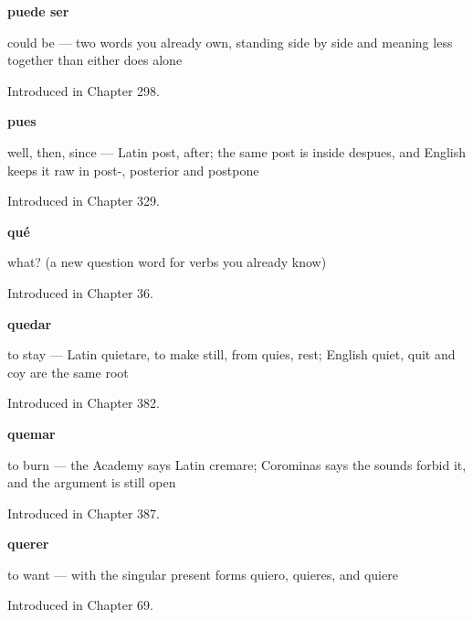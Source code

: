 \noindent\begin{minipage}[t]{\linewidth}
\raggedright
\textbf{puede ser}\par
\small could be — two words you already own, standing side by side and meaning less together than either does alone\par
\footnotesize Introduced in Chapter 298.
\end{minipage}\par\medskip

\noindent\begin{minipage}[t]{\linewidth}
\raggedright
\textbf{pues}\par
\small well, then, since — Latin post, after; the same post is inside despues, and English keeps it raw in post-, posterior and postpone\par
\footnotesize Introduced in Chapter 329.
\end{minipage}\par\medskip

\noindent\begin{minipage}[t]{\linewidth}
\raggedright
\textbf{qué}\par
\small what? (a new question word for verbs you already know)\par
\footnotesize Introduced in Chapter 36.
\end{minipage}\par\medskip

\noindent\begin{minipage}[t]{\linewidth}
\raggedright
\textbf{quedar}\par
\small to stay — Latin quietare, to make still, from quies, rest; English quiet, quit and coy are the same root\par
\footnotesize Introduced in Chapter 382.
\end{minipage}\par\medskip

\noindent\begin{minipage}[t]{\linewidth}
\raggedright
\textbf{quemar}\par
\small to burn — the Academy says Latin cremare; Corominas says the sounds forbid it, and the argument is still open\par
\footnotesize Introduced in Chapter 387.
\end{minipage}\par\medskip

\noindent\begin{minipage}[t]{\linewidth}
\raggedright
\textbf{querer}\par
\small to want — with the singular present forms quiero, quieres, and quiere\par
\footnotesize Introduced in Chapter 69.
\end{minipage}\par\medskip


